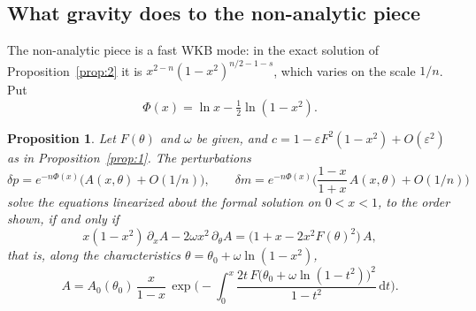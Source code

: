 \documentclass{amsart}
\numberwithin{equation}{section}
\theoremstyle{plain}
\newtheorem{proposition}{Proposition}
\theoremstyle{definition}
\theoremstyle{remark}
\newcommand{\eps}{\varepsilon}
\newcommand{\dd}{\mathrm{d}}
\begin{document}
\subsection{What gravity does to the non-analytic piece}
The non-analytic piece is a fast WKB mode: in the exact solution of Proposition~\ref{prop:2} it is
$x^{2-n}(1-x^2)^{n/2-1-s}$, which varies on the scale $1/n$. Put
\begin{equation}\label{eq:Phi}
\Phi(x) = \ln x - \tfrac12\ln(1-x^2) .
\end{equation}

\begin{proposition}\label{prop:3}
Let $F(\theta)$ and $\omega$ be given, and $c = 1 - \eps F^2(1-x^2) + O(\eps^2)$ as in Proposition~\ref{prop:1}. The
perturbations
\[
\delta p = e^{-n\Phi(x)}\big(A(x,\theta) + O(1/n)\big), \qquad
\delta m = e^{-n\Phi(x)}\Big(\frac{1-x}{1+x}\,A(x,\theta) + O(1/n)\Big)
\]
solve the equations linearized about the formal solution on $0 < x < 1$, to the order shown, if and only if
\begin{equation}\label{eq:transport}
x(1-x^2)\,\partial_x A - 2\omega x^2\,\partial_\theta A = \big(1 + x - 2x^2F(\theta)^2\big)\,A ,
\end{equation}
that is, along the characteristics $\theta = \theta_0 + \omega\ln(1-x^2)$,
\begin{equation}\label{eq:transportsol}
A = A_0(\theta_0)\,\frac{x}{1-x}\,\exp\!\Big(-\int_0^x \frac{2t\,F\big(\theta_0 + \omega\ln(1-t^2)\big)^2}{1-t^2}\,\dd t\Big) .
\end{equation}
\end{proposition}
\end{document}
